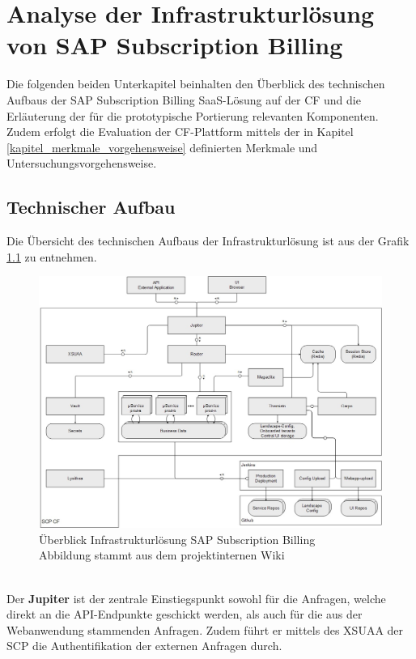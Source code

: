 \chapter{Analyse der Infrastrukturlösung von SAP Subscription Billing}
\label{Kapitel_Infrastruktur_CF}
Die folgenden beiden Unterkapitel beinhalten den Überblick des technischen Aufbaus der SAP Subscription Billing \ac{SaaS}-Lösung auf der \ac{CF} und die Erläuterung der für die prototypische Portierung relevanten Komponenten. Zudem erfolgt die Evaluation der \ac{CF}-Plattform mittels der in Kapitel \ref{kapitel_merkmale_vorgehensweise} definierten Merkmale und Untersuchungsvorgehensweise.
\section{Technischer Aufbau}
\label{technischer_aufbau_cf}
Die Übersicht des technischen Aufbaus der Infrastrukturlösung ist aus der Grafik \ref{grafik_technischer_aufbau_cf} zu entnehmen.
\begin{figure}[h]
	\begin{center}
		\includegraphics[width=16cm]{img/cf_infrastruktur.JPG}
		\caption[Überblick Infrastrukturlösung SAP Subscription Billing]{Überblick Infrastrukturlösung SAP Subscription Billing\\ Abbildung stammt aus dem projektinternen Wiki}
		\label{grafik_technischer_aufbau_cf}
	\end{center}
\end{figure}
\\
Der \textbf{Jupiter} ist der zentrale Einstiegspunkt sowohl für die Anfragen, welche direkt an die \ac{API}-Endpunkte geschickt werden, als auch für die aus der Webanwendung stammenden Anfragen. Zudem führt er mittels des \ac{XSUAA} der \ac{SCP} die Authentifikation der externen Anfragen durch.
